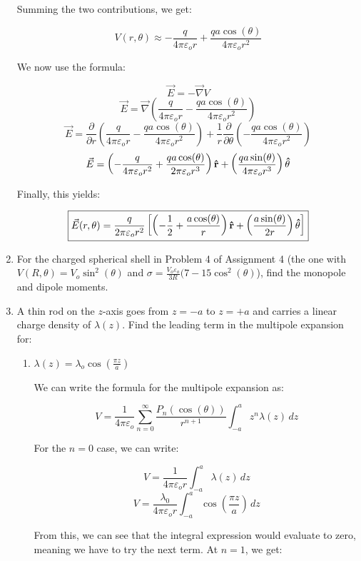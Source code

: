 \begin{enumerate}
    Summing the two contributions, we get:

    $$V(r,\theta)\approx-\frac{q}{4\pi\varepsilon_o r}+\frac{qa\cos(\theta)}{4\pi\varepsilon_or^2}$$

    We now use the formula:

    $$\vec{E}=-\vec{\nabla}V$$
    $$\vec{E}=\vec{\nabla}\left(  \frac{q}{4\pi\varepsilon_or}-\frac{qa\cos(\theta)}{4\pi\varepsilon_or^2}\right)$$
    $$\vec{E}=\frac{\partial}{\partial r}\left(  \frac{q}{4\pi\varepsilon_or}-\frac{qa\cos(\theta)}{4\pi\varepsilon_or^2}\right)+\frac{1}{r}\frac{\partial}{\partial\theta}\left(-\frac{qa\cos(\theta)}{4\pi\varepsilon_or^2}\right)$$
    $$\vec{E}=\left(  -\frac{q}{4\pi\varepsilon_or^2}+\frac{qa\cos(\theta)}{2\pi\varepsilon_or^3}\right)\bold{\hat{r}}+\left(\frac{qa\sin(\theta)}{4\pi\varepsilon_or^3}\right)\bold{\hat{\theta}}$$

    Finally, this yields:

    $$\boxed{\vec{E}(r,\theta)=\frac{q}{2\pi\varepsilon_or^2}\left[ \left( -\frac{1}{2}+\frac{a\cos(\theta)}{r} \right)\bold{\hat{r}} +\left( \frac{a\sin(\theta)}{2r} \right)\bold{\hat{\theta}}\right]}$$

  \item For the charged spherical shell in Problem 4 of Assignment 4 (the one with $V(R,\theta)=V_o\sin^2(\theta)$ and $\sigma=\frac{V_o\varepsilon_o}{3R}(7-15\cos^2(\theta)$), find the monopole and dipole moments.

  \item A thin rod on the $z$-axis goes from $z=-a$ to $z=+a$ and carries a linear charge density of $\lambda(z)$. Find the leading term in the multipole expansion for:

    \begin{enumerate}

      \item $\lambda(z)=\lambda_o\cos\left( \frac{\pi z}{a} \right)$

        We can write the formula for the multipole expansion as:

        $$V=\frac{1}{4\pi\varepsilon_o}\sum_{n=0}^\infty \frac{P_n(\cos(\theta))}{r^{n+1}}\int_{-a}^az^n\lambda(z)\,dz$$

        For the $n=0$ case, we can write:

        $$V=\frac{1}{4\pi\varepsilon_o r}\int_{-a}^a \lambda(z)\,dz$$
        $$V=\frac{\lambda_0}{4\pi\varepsilon_o r}\int_{-a}^a \cos\left( \frac{\pi z}{a} \right)\,dz$$

        From this, we can see that the integral expression would evaluate to zero, meaning we have to try the next term. At $n=1$, we get:


\end{enumerate}
\end{enumerate}
